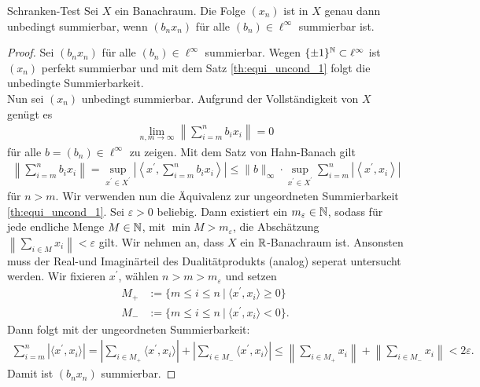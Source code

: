 \begin{genericthm}{Schranken-Test}\label{th:bounded_test}
	Sei $ X $ ein Banachraum.
	Die Folge $ (x_n) $ ist in $ X $ genau dann unbedingt summierbar, wenn
	$ (b_n x_n) $ für alle $ (b_n) \in \ell^\infty $  summierbar ist.
\end{genericthm}
\begin{proof}
	Sei $ (b_n x_n) $ für alle $ (b_n) \in \ell^\infty $ summierbar.
	Wegen $ \{\pm 1\}^{\mathbb{N}} \subset \ell^\infty $ ist $ (x_n) $ perfekt summierbar und mit dem Satz \ref{th:equi_uncond_1} folgt die unbedingte Summierbarkeit.\\
	Nun sei $ (x_n) $ unbedingt summierbar.
	Aufgrund der Vollständigkeit von $ X $ genügt es 
	\begin{align*}
		\lim \limits_{n,m \to \infty } \left\| \sum \limits_{i = m }^n b_i x_i \right\| = 0
	\end{align*}
	für alle $ b =  (b_n)  \in \ell^\infty$ zu zeigen. Mit dem Satz von Hahn-Banach gilt
	\begin{align*}
		 \left\| \sum \limits_{i = m }^n b_i x_i \right\|
		 =
		 \sup \limits_{x^\prime \in X^\prime} \left| \left\langle x^\prime, \sum \limits_{i = m }^n b_i x_i \right\rangle \right|
		 \leq
		 \| b \|_\infty \cdot \sup \limits_{x^\prime \in X^\prime} \sum \limits_{i = m }^n \left| \left\langle x^\prime,   x_i \right\rangle \right|
	\end{align*}
	für $ n > m  $.
	Wir verwenden nun die Äquivalenz zur ungeordneten Summierbarkeit \ref{th:equi_uncond_1}.
	Sei $ \varepsilon > 0  $ beliebig. Dann existiert ein $ m_\varepsilon  \in \mathbb{N}$, sodass
	für jede endliche Menge $ M \in \mathbb{N} $, mit $ \min M >m_\varepsilon $, die Abschätzung
	$ \left\| \sum_{i \in M} x_i \right\| < \varepsilon $ gilt.
	Wir nehmen an, dass $ X $ ein $ \mathbb{R} $-Banachraum ist.
	Ansonsten muss der Real-und Imaginärteil des Dualitätprodukts (analog) seperat untersucht werden.
	Wir fixieren  $ x^\prime $, wählen $ n >m > m_\varepsilon $ und setzen
	\begin{align*}
		M_+ &:= \{m \leq i \leq n \ | \ \langle x^\prime, x_i  \rangle \geq 0 \}\\
		M_- &:=  \{m \leq i \leq n \ | \ \langle x^\prime, x_i \rangle   <  0 \}.
	\end{align*}
	Dann folgt mit der ungeordneten Summierbarkeit:
	\begin{align*}
		\sum 
		\limits_{i = m }^n |\langle x^\prime ,x_i \rangle | 
		=
		\left|
		\sum 
		\limits_{i \in M_+ } \langle x^\prime , x_i \rangle 
		\right|
		+ 
			\left|
		\sum 
		\limits_{i \in M_- } \langle x^\prime , x_i \rangle 
		\right|
		\leq
		\left\| \sum	\limits_{i \in M_+ } x_i \right\|
		+
		\left\| \sum	\limits_{i \in M_- } x_i \right\| 
		< 2 \varepsilon.
	\end{align*}
	Damit ist $ (b_n x_n) $ summierbar.
\end{proof}

